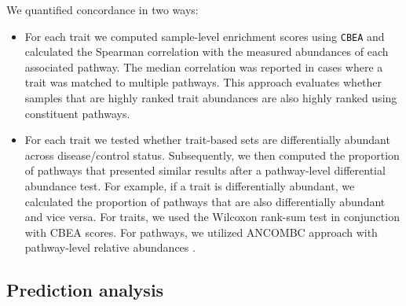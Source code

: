 \documentclass{bmcart}
\begin{document}
\noindent We quantified concordance in two ways: 
\begin{itemize}
    \item For each trait we computed sample-level enrichment scores using \texttt{CBEA} and calculated the Spearman correlation with the measured abundances of each associated pathway. The median correlation was reported in cases where a trait was matched to multiple pathways. This approach evaluates whether samples that are highly ranked trait abundances are also highly ranked using constituent pathways.  
    \item  For each trait we tested whether trait-based sets are differentially abundant across disease/control status. Subsequently, we then computed the proportion of pathways that presented similar results after a pathway-level differential abundance test. For example, if a trait is differentially abundant, we calculated the proportion of pathways that are also differentially abundant and vice versa. For traits, we used the Wilcoxon rank-sum test in conjunction with CBEA scores. For pathways, we utilized ANCOMBC approach with pathway-level relative abundances \cite{missing}. 
\end{itemize} 

\subsection*{Prediction analysis}  
\end{document}
